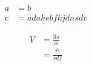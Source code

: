 \begin{equation}
\begin{split}
a & = b \\
c & = a dahebfkjdnsdv
\end{split}
\end{equation}



\begin{equation}
\begin{split}
V & = \frac{3\pi}{\alpha} \\
& = \frac{^{ ds }}{sdf}
\end{split}
\end{equation}













